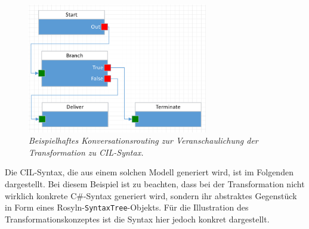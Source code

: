 \newpage

\begin{figure} %
	\centering
		\includegraphics[width=0.7\textwidth]{img/FlowToCodeExample.png}
	\caption[Beispielhaftes Konversationsrouting zur Veranschaulichung der Transformation zu CIL-Syntax]{\textit{Beispielhaftes Konversationsrouting zur Veranschaulichung der Transformation zu CIL-Syntax.}}
	\label{fig:FlowToCode}
\end{figure}
\noindent Die CIL-Syntax, die aus einem solchen Modell generiert wird, ist im Folgenden dargestellt. Bei diesem Beispiel ist zu beachten, dass bei der Transformation nicht wirklich konkrete C\#-Syntax generiert wird, sondern ihr abstraktes Gegenstück in Form eines Rosyln-\texttt{SyntaxTree}-Objekts. Für die Illustration des Transformationskonzeptes ist die Syntax hier jedoch konkret dargestellt.



